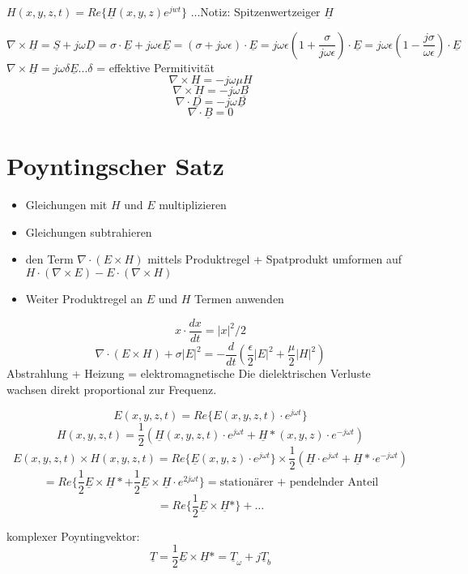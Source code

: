 \documentclass[a4paper]{article}
\begin{document}
$H(x,y,z,t)=Re\{\underline{H}(x,y,z)e^{jwt}\}$ ...Notiz: Spitzenwertzeiger $\underline{H}$

\[\nabla \times \underline{H} = \underline{S} + j\omega \underline{D} = \sigma\cdot \underline{E} + j\omega\epsilon \underline{E} = (\sigma + j\omega\epsilon)\cdot \underline{E} = j\omega\epsilon(1+\frac{\sigma}{j\omega\epsilon})\cdot \underline{E} = j\omega\epsilon(1 - \frac{j\sigma}{\omega\epsilon})\cdot \underline{E}\]
$\nabla \times \underline{H}= j\omega \delta \underline{E}$...$\delta$ = effektive Permitivität
\[\nabla \times  \underline{H} = -j\omega\mu \underline{H}\]
\[\nabla\times\underline{H} = -j\omega \underline{B}\]
\[\nabla\cdot\underline{D} = -j\omega \underline{B}\]
\[\nabla\cdot\underline{B} = 0\]

\section*{Poyntingscher Satz}
\begin{itemize}
    \item Gleichungen mit $H$ und $E$ multiplizieren
    \item Gleichungen subtrahieren
    \item den Term $\nabla\cdot (E\times H)$ mittels Produktregel + Spatprodukt umformen auf $H\cdot (\nabla\times E) - E\cdot (\nabla\times H)$
    \item Weiter Produktregel an $E$ und $H$ Termen anwenden
\end{itemize}

\[x\cdot \frac{dx}{dt}= |x|^2/2\]
\[\nabla\cdot (E\times H) + \sigma |E|^2 = -\frac{d}{dt}(\frac{\epsilon}{2} |E|^2 + \frac{\mu}{2}|H|^2)\]
Abstrahlung + Heizung = elektromagnetische\newline
Die dielektrischen Verluste wachsen direkt proportional zur Frequenz.

\[E(x,y,z,t)=Re\{E(x,y,z,t)\cdot e^{j\omega t}\}\]
\[H(x,y,z,t)=\frac{1}{2}(\underline{H}(x,y,z,t)\cdot e^{j\omega t} + \underline{H}\ast(x,y,z)\cdot e^{-j\omega t})\]
\[E(x,y,z,t)\times H(x,y,z,t)=Re\{\underline{E}(x,y,z)\cdot e^{j\omega t}\} \times \frac{1}{2}(\underline{H}\cdot e^{j\omega t}+\underline{H}\ast\cdot e^{-j\omega t})\]
\[=Re\{\frac{1}{2}\underline{E}\times \underline{H}\ast + \frac{1}{2}\underline{E}\times \underline{H}\cdot e^{2j\omega t}\} = \text{stationärer + pendelnder Anteil}\]
\[=Re\{\frac{1}{2}\underline{E}\times \underline{H}\ast\} + \ldots\]

komplexer Poyntingvektor: \[\underline{T}=\frac{1}{2}\underline{E}\times \underline{H}\ast= \underline{T}_{\omega}+j \underline{T}_{b}\]
\end{document}
